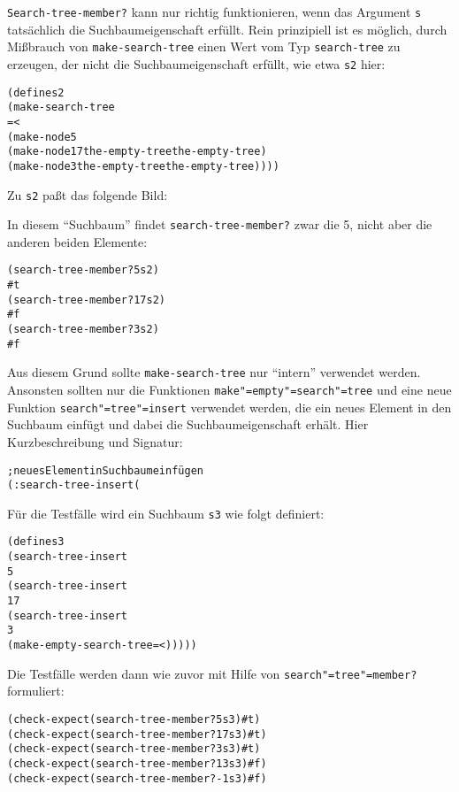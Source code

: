 \texttt{Search-tree-member?} kann nur richtig funktionieren, wenn das
Argument \texttt{s} tatsächlich die Suchbaumeigenschaft
erfüllt.  Rein prinzipiell ist es möglich, durch Mißbrauch von
\texttt{make-search-tree} einen Wert vom Typ \texttt{search-tree} zu
erzeugen, der nicht die Suchbaumeigenschaft erfüllt, wie etwa
\texttt{s2} hier:
%
\begin{alltt}
(define s2
  (make-search-tree
   = <
   (make-node 5
              (make-node 17 the-empty-tree the-empty-tree)
              (make-node 3 the-empty-tree the-empty-tree))))
\end{alltt}
%
Zu \texttt{s2} paßt das folgende Bild:
%
\begin{pspdf}
\begin{center}
  {
    }
\end{center}
\end{pspdf}
%
In diesem "`Suchbaum"' findet \texttt{search-tree-member?} zwar
die 5, nicht aber die anderen beiden Elemente:\label{label:non-search-tree}
%
\begin{alltt}
(search-tree-member? 5 s2)
\evalsto{} #t
(search-tree-member? 17 s2)
\evalsto{} #f
(search-tree-member? 3 s2)
\evalsto{} #f
\end{alltt}
%
Aus diesem Grund sollte \texttt{make-search-tree} nur "`intern"'
verwendet werden.   Ansonsten sollten nur die Funktionen \texttt{make"=empty"=search"=tree} und eine
neue Funktion \texttt{search"=tree"=insert} verwendet werden, die
ein neues Element in den
Suchbaum einfügt und dabei die Suchbaumeigenschaft
erhält.
Hier Kurzbeschreibung und Signatur:
%
\begin{alltt}
; neues Element in Suchbaum einfügen
(: search-tree-insert (%a (search-tree-of %a) -> (search-tree-of %a)))
\end{alltt}
%
Für die Testfälle wird ein Suchbaum \texttt{s3} wie folgt definiert:
%
\begin{alltt}
(define s3
  (search-tree-insert
   5
   (search-tree-insert
    17
    (search-tree-insert
     3
     (make-empty-search-tree = <)))))
\end{alltt}
%
Die Testfälle werden dann wie zuvor mit Hilfe von
\texttt{search"=tree"=member?} formuliert:
%
\begin{alltt}
(check-expect (search-tree-member? 5 s3) #t)
(check-expect (search-tree-member? 17 s3) #t)
(check-expect (search-tree-member? 3 s3) #t)
(check-expect (search-tree-member? 13 s3) #f)
(check-expect (search-tree-member? -1 s3) #f)
\end{alltt}
